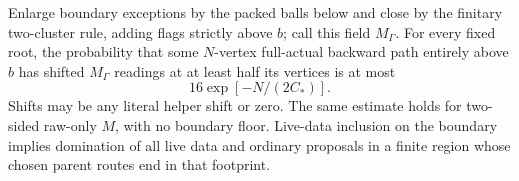 \begin{lemma}\label{lem:three-boundary}
Enlarge boundary exceptions by the packed balls below and close by the finitary two-cluster rule, adding flags strictly above $b$; call this field $M_\Gamma$. For every fixed root, the probability that some $N$-vertex full-actual backward path entirely above $b$ has shifted $M_\Gamma$ readings at at least half its vertices is at most
\begin{equation}\label{eq:three-boundary-tail}
 16\exp[-N/(2C_*)].
\end{equation}
Shifts may be any literal helper shift or zero. The same estimate holds for two-sided raw-only $M$, with no boundary floor. Live-data inclusion on the boundary implies domination of all live data and ordinary proposals in a finite region whose chosen parent routes end in that footprint.
\end{lemma}

